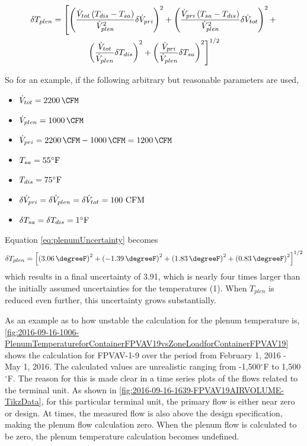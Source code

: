 \begin{multline}\label{eq:plenumUncertainty}
    \delta T_{plen} = \left[\left(  \frac{\dot{V}_{tot}\left(T_{dis}-T_{sa} \right)}{{\dot{V}_{plen}}^2}   \delta \dot{V}_{pri} \right)^2  +\left(\frac{\dot{V}_{pri}\left(T_{sa}-T_{dis} \right)}{{\dot{V}_{plen}}^2}      \delta \dot{V}_{tot}   \right)^2 + \right. \\
    \left. \left( \frac{\dot{V}_{tot}}{\dot{V}_{plen}} \delta T_{dis}   \right)^2 + \left(\frac{\dot{V}_{pri}}{\dot{V}_{plen}}  \delta T_{sa}   \right)^2  \right]^{1/2}
\end{multline}

So for an example, if the following arbitrary but reasonable parameters are used, 
%
\newcommand{\flowtotvalue}{\SI{2200}{\CFM}}
\newcommand{\plenflowvalue}{\SI{1000}{\CFM}}
%
\begin{itemize}
    \item \(\totflow{}=\flowtotvalue\)
    \item \(\plenflow{}=\plenflowvalue\)
    \item \(\priflow=\flowtotvalue - \plenflowvalue = \SI{1200}{\CFM} \)
    \item \(T_{sa} = 55^{\circ}\text{F} \)
    \item \(T_{dis} = 75^{\circ}\text{F} \)
    \item \(\delta\dot{V}_{pri}{}=\delta\dot{V}_{plen}=\delta\dot{V}_{tot}=100 \text{ CFM}\)
    \item \(\delta T_{sa} = \delta T_{dis} = 1^{\circ} \text{F} \)
\end{itemize}
%
Equation \ref{eq:plenumUncertainty} becomes
\begin{equation}\label{eq:plenumUncertainty2}
    \delta T_{plen} = \left[\left(  \SI{3.06}{\degreeF}  \right)^2  +\left( \SI{-1.39}{\degreeF}  \right)^2 +  \left( \SI{1.83}{\degreeF} \right)^2 + \left(\SI{0.83}{\degreeF}  \right)^2  \right]^{1/2}
\end{equation}
which results in a final uncertainty of \SI{3.91}{\degreeF}, which is
nearly four times larger than the initially assumed uncertainties for
the temperatures (\SI{1}{\degreeF}). When \(T_{plen}\) is reduced even
further, this uncertainty grows substantially.  

As an example as to how unstable the calculation for the plenum
temperature is, \figref{}
\ref{fig:2016-09-16-1006-PlenumTemperatureforContainerFPVAV19vsZoneLoadforContainerFPVAV19}
shows the calculation for FPVAV-1-9 over the period from February 1,
2016 - May 1, 2016. The calculated values are unrealistic ranging from
-1,500\(^\circ\)F to 1,500\(^\circ\)F. The reason for this is made clear
in a time series plots of the flows related to the terminal unit. As
shown in \figref{} \ref{fig:2016-09-16-1639-FPVAV19AIRVOLUME-TikzData},
for this particular terminal unit, the primary flow is either near zero
or design. At times, the measured flow is also above the design
specification, making the plenum flow calculation zero. When the plenum flow is
calculated to be zero, the plenum temperature calculation becomes
undefined.

